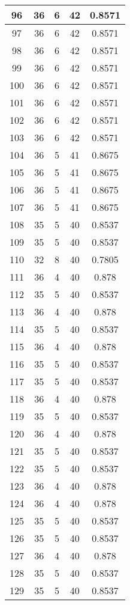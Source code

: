 \documentclass[letterpaper, 12pt]{article}
\begin{document}
\begin{longtable}{|c|c|c|c|c|}
\hline
96 & 36 & 6 & 42 & 0.8571 \\
\hline
97 & 36 & 6 & 42 & 0.8571 \\
\hline
98 & 36 & 6 & 42 & 0.8571 \\
\hline
99 & 36 & 6 & 42 & 0.8571 \\
\hline
100 & 36 & 6 & 42 & 0.8571 \\
\hline
101 & 36 & 6 & 42 & 0.8571 \\
\hline
102 & 36 & 6 & 42 & 0.8571 \\
\hline
103 & 36 & 6 & 42 & 0.8571 \\
\hline
104 & 36 & 5 & 41 & 0.8675 \\
\hline
105 & 36 & 5 & 41 & 0.8675 \\
\hline
106 & 36 & 5 & 41 & 0.8675 \\
\hline
107 & 36 & 5 & 41 & 0.8675 \\
\hline
108 & 35 & 5 & 40 & 0.8537 \\
\hline
109 & 35 & 5 & 40 & 0.8537 \\
\hline
110 & 32 & 8 & 40 & 0.7805 \\
\hline
111 & 36 & 4 & 40 & 0.878 \\
\hline
112 & 35 & 5 & 40 & 0.8537 \\
\hline
113 & 36 & 4 & 40 & 0.878 \\
\hline
114 & 35 & 5 & 40 & 0.8537 \\
\hline
115 & 36 & 4 & 40 & 0.878 \\
\hline
116 & 35 & 5 & 40 & 0.8537 \\
\hline
117 & 35 & 5 & 40 & 0.8537 \\
\hline
118 & 36 & 4 & 40 & 0.878 \\
\hline
119 & 35 & 5 & 40 & 0.8537 \\
\hline
120 & 36 & 4 & 40 & 0.878 \\
\hline
121 & 35 & 5 & 40 & 0.8537 \\
\hline
122 & 35 & 5 & 40 & 0.8537 \\
\hline
123 & 36 & 4 & 40 & 0.878 \\
\hline
124 & 36 & 4 & 40 & 0.878 \\
\hline
125 & 35 & 5 & 40 & 0.8537 \\
\hline
126 & 35 & 5 & 40 & 0.8537 \\
\hline
127 & 36 & 4 & 40 & 0.878 \\
\hline
128 & 35 & 5 & 40 & 0.8537 \\
\hline
129 & 35 & 5 & 40 & 0.8537 \\

\end{longtable}
\end{document}
